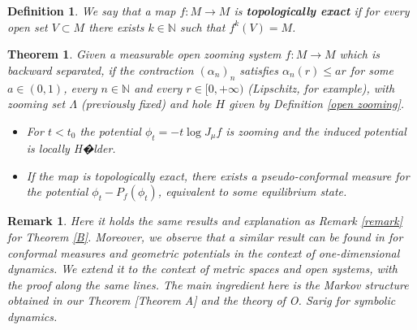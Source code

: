 \documentclass[12pt,a4paper]{amsart}
\theoremstyle{plain}
\newtheorem{definition}{Definition}[subsection]
\newtheorem{remark}{Remark}[subsection]
\newtheorem{theorema}{Theorem}
\begin{document}
\begin{definition}
	We say that a map $f:M \to M$ is \textbf{\textit{topologically exact}} if for every open set $V \subset M$ there exists $k \in \mathbb{N}$ such that $f^{k}(V) = M$. 	
\end{definition}

\begin{theorema}
	\label{C}
	Given a measurable open zooming system $f:M \to M$ which is backward separated, if the contraction $(\alpha_{n})_{n}$ satisfies $\alpha_{n}(r) \leq ar$ for some $a \in (0,1)$, every $n \in \mathbb{N}$ and every $r \in [0,+\infty)$ (Lipschitz, for example), with zooming set  $\Lambda$ (previously fixed) and hole $H$ given by Definition \ref{open zooming}. 
	
	\begin{itemize}
		
		\item For $t < t_{0}$ the potential $\phi_{t} = -t \log J_{\mu}f$ is zooming and the induced potential is locally H�lder. 
		
		\item If the map is topologically exact, there exists a pseudo-conformal measure for the potential $\phi_{t} - P_{f}(\phi_{t})$, equivalent to some equilibrium state.
		
		
	
		
	\end{itemize} 
\end{theorema}

\begin{remark}
	Here it holds the same results and explanation as Remark \ref{remark} for Theorem \ref{B}. Moreover, we observe that a similar result can be found in \cite{IT1} for conformal measures and geometric potentials in the context of one-dimensional dynamics. We extend it to the context of metric spaces and open systems, with the proof along the same lines. The main ingredient here is the Markov structure obtained in our Theorem \cite{S}[Theorem A] and the theory of O. Sarig for symbolic dynamics.
\end{remark}
\end{document}
